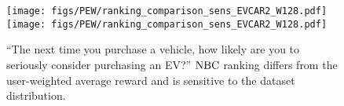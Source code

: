 \begin{figure}%
    \centering
    \ifarxiv
    \texttt{[image: figs/PEW/ranking\_comparison\_sens\_EVCAR2\_W128.pdf]}
    \else
    \texttt{[image: figs/PEW/ranking\_comparison\_sens\_EVCAR2\_W128.pdf]}
    \fi
    \vspace{-2mm}
    \caption{  
    ``The next time you purchase a vehicle, how likely are you to seriously consider purchasing an EV?''
    ${\rm NBC}$ ranking differs from the user-weighted average reward and is sensitive to the dataset distribution.
    }
    \label{fig:reward_vs_nbc}
\end{figure}




% 



